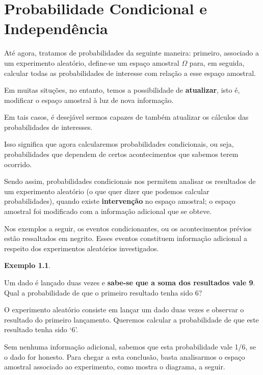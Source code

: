 \documentclass[
]{book}
\theoremstyle{definition}
\theoremstyle{definition}
\newtheorem{example}{Exemplo}[chapter]
\theoremstyle{definition}
\theoremstyle{remark}
\begin{document}
\hypertarget{probabilidade-condicional-e-independuxeancia}{%
\chapter{Probabilidade Condicional e Independência}\label{probabilidade-condicional-e-independuxeancia}}

Até agora, tratamos de probabilidades da seguinte maneira: primeiro, associado a um experimento aleatório, define-se um espaço amostral \(\Omega\) para, em seguida, calcular todas as probabilidades de interesse com relação a esse espaço amostral.

Em muitas situções, no entanto, temos a possibilidade de \textbf{atualizar}, isto é, modificar o espaço amostral à luz de nova informação.

Em tais casos, é desejável sermos capazes de também atualizar os cálculos das probabilidades de interesses.

Isso significa que agora calcularemos probabilidades condicionais, ou seja, probabilidades que dependem de certos acontecimentos que sabemos terem ocorrido.

Sendo assim, probabilidades condicionais nos permitem analisar os resultados de um experimento aleatório (o que quer dizer que podemos calcular probabilidades), quando existe \textbf{intervenção} no espaço amostral; o espaço amostral foi modificado com a informação adicional que se obteve.

Nos exemplos a seguir, os eventos condicionantes, ou os acontecimentos prévios estão ressaltados em negrito. Esses eventos constituem informação adicional a respeito dos experimentos aleatórios investigados.

\begin{example}
\protect\hypertarget{exm:unnamed-chunk-1}{}{\label{exm:unnamed-chunk-1} }
\end{example}

Um dado é lançado duas vezes e \textbf{sabe-se que a soma dos resultados vale 9}. Qual a probabilidade de que o primeiro resultado tenha sido 6?

O experimento aleatório consiste em lançar um dado duas vezes e observar o resultado do primeiro lançamento. Queremos calcular a probabilidade de que este resultado tenha sido `6'.

Sem nenhuma informação adicional, sabemos que esta probabilidade vale 1/6, se o dado for honesto. Para chegar a esta conclusão, basta analisarmos o espaço amostral associado ao experimento, como mostra o diagrama, a seguir.
\end{document}
